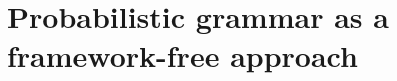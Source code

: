 \section{Probabilistic grammar as a framework-free approach}
\label{sec:probabilisticgrammarasaframeworkfreeapproach}


